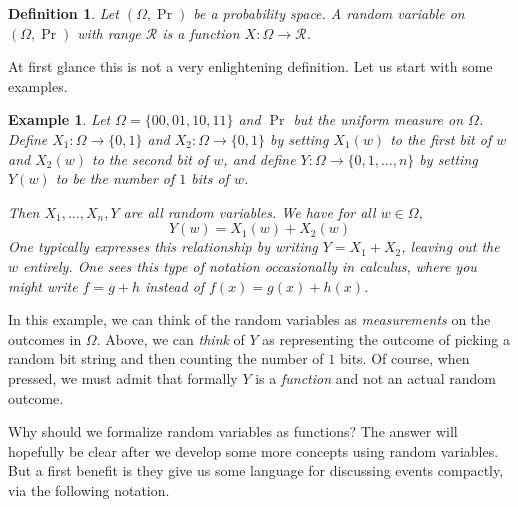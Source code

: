\documentclass[11pt]{article}
\newtheorem{definition}{Definition}
\newtheorem{example}{Example}
\newcommand{\bits}{\{0,1\}}
\newcommand{\rvrange}{\mathcal{R}}
\begin{document}
\begin{definition}
    Let $(\Omega,\Pr)$ be a probability space. A random variable on $(\Omega,\Pr)$ with range $\rvrange$ is a function $X:\Omega\to\rvrange$.
\end{definition}
At first glance this is not a very enlightening definition. Let us
start with some examples.
\iffalse
\begin{example}
    Let $\Omega=\bits^n$ and $\Pr$ but the uniform measure. Define
    $X_i:\Omega \to \bits$ by setting $X_i(w)$ to 
    the $i$-th bit of $w$, and define $Y:\Omega\to\{0,1,\ldots,n\}$
    by setting $Y(w)$ to be the number of $1$ bits of $w$.
    Then $X_1,\ldots,X_n,Y$ are all random variables.
    We have for all $w\in\Omega$,
    \[
        Y(w) = \sum_{i=1}^n X_i(w).
    \]
    One typically expresses this relationship by writing 
    $Y = \sum_{i=1}^n X_i$, leaving out the $w$ entirely. One sees this
    type of notation occasionally in calculus, where you might write 
    $f = g+h$ instead of $f(x) = g(x) + h(x)$.
\end{example}
\fi
\begin{example}
    Let $\Omega=\{00,01,10,11\}$ and $\Pr$ but the uniform measure on $\Omega$. 
    Define $X_1:\Omega \to \bits$ and $X_2:\Omega \to \bits$
    by setting $X_1(w)$ to the first bit of $w$ and $X_2(w)$ to the second
    bit of $w$,
    and define $Y:\Omega\to\{0,1,\ldots,n\}$
    by setting $Y(w)$ to be the number of $1$ bits of $w$.

    Then $X_1,\ldots,X_n,Y$ are all random variables.
    We have for all $w\in\Omega$,
    \[
        Y(w) = X_1(w) + X_2(w)
    \]
    One typically expresses this relationship by writing 
    $Y = X_1+X_2$, leaving out the $w$ entirely. One sees this
    type of notation occasionally in calculus, where you might write 
    $f = g+h$ instead of $f(x) = g(x) + h(x)$.
\end{example}

In this example, we can think of the random variables as \emph{measurements} on
the outcomes in $\Omega$. Above, we can \emph{think} of $Y$ as representing
the outcome of picking a random bit string and then counting the number of
$1$ bits. Of course, when pressed, we must admit that formally $Y$ is a
\emph{function} and not an actual random outcome.

Why should we formalize random variables as functions? The answer will
hopefully be clear after we develop some more concepts using random variables.
But a first benefit is they give us some language for discussing events
compactly, via the following notation.
\end{document}
